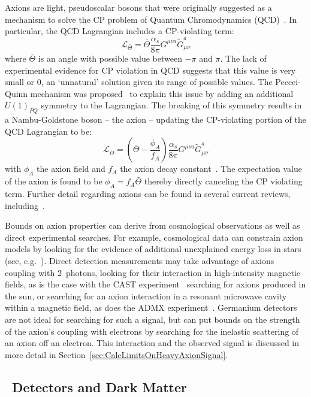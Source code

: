 	Axions are light, pseudoscalar bosons that were originally suggested as a
mechanism to solve the CP problem of Quantum Chromodynamics (QCD)~\cite{Pec77}.  In particular, the QCD
Lagrangian includes a CP-violating term: \[
			\mathcal{L}_{\bar{\Theta}} = \bar{\Theta} \frac{\alpha_s}{8 \pi} G^{\mu \nu a} \tilde{G}_{\mu \nu}^{a}
			\]
where $\bar{\Theta}$ is an angle with possible value between $-\pi$ and $\pi$.  The lack of experimental evidence for CP violation in QCD suggests that this value is very small or 0, an `unnatural' solution given its range of possible values.  The Peccei-Quinn mechanism was proposed~\cite{Pec77} to explain this issue by adding an additional $U(1)_{PQ}$ symmetry to the Lagrangian.  The breaking of this symmetry results in a Nambu-Goldstone boson -- the axion -- updating the CP-violating portion of the QCD Lagrangian to be:
			\[
			\mathcal{L}_{\bar{\Theta}} = \left( \bar{\Theta} - \frac{\phi_{A}}{f_{A}}\right) \frac{\alpha_s}{8 \pi} G^{\mu \nu a} \tilde{G}_{\mu \nu}^{a}
			\]	
with $\phi_{A}$ the axion field and $f_{A}$ the axion decay constant~\cite{Amsler20081}.  The expectation value of the axion is found to be $\phi_{A} = f_{A} \bar{\Theta}$ thereby directly canceling the CP violating term.  Further detail regarding axions can be found in several current reviews, including~\cite{Amsler20081,2008LNP}.
	
	Bounds on axion properties can derive from cosmological observations as well as direct experimental searches.  For example, cosmological data can constrain axion models by looking for the evidence of additional unexplained energy loss in stars (see, e.g.~\cite{Gondolo09,Raffelt95}).  Direct detection measurements may take advantage of axions coupling with 2~photons, looking for their interaction in high-intensity magnetic fields, as is the case with the CAST experiment~\cite{Arik09} searching for axions produced in the sun, or searching for an axion interaction in a resonant microwave cavity within a magnetic field, as does the ADMX experiment~\cite{Asz10}.  Germanium detectors are not ideal for searching for such a signal, but can put bounds on the strength of the axion's coupling with electrons by searching for the inelastic scattering of an axion off an electron.  This interaction and the observed signal is discussed in more detail in Section~\ref{sec:CalcLimitsOnHeavyAxionSignal}.
		
		\subsection{\ppc~Detectors and Dark Matter}

